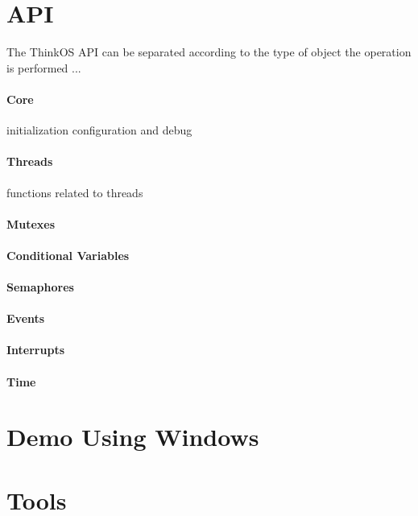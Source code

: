 \section{API}

The ThinkOS API can be separated according to the type of object the operation is performed ...

\paragraph{Core}{initialization configuration and debug}

\paragraph{Threads}{functions related to threads}

\paragraph{Mutexes}

\paragraph{Conditional Variables}

\paragraph{Semaphores}

\paragraph{Events}

\paragraph{Interrupts}

\paragraph{Time}




\section {Demo Using Windows}

%


\section {Tools}
